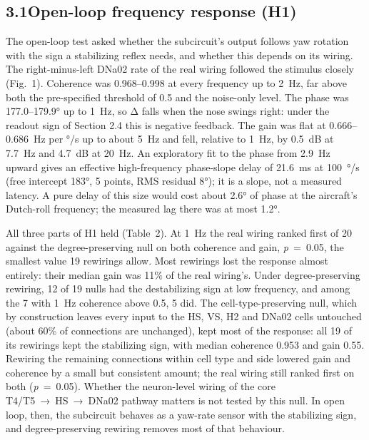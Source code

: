 \documentclass[11pt,letterpaper]{article}
\begin{document}
\subsection{\texorpdfstring{3.1\quad Open-loop frequency response
(H1)}{3.1Open-loop frequency response (H1)}}\label{open-loop-frequency-response-h1}

\noindent The open-loop test asked whether the subcircuit's output
follows yaw rotation with the sign a stabilizing reflex needs, and
whether this depends on its wiring. The right-minus-left DNa02 rate of
the real wiring followed the stimulus closely (Fig.~1). Coherence was
0.968--0.998 at every frequency up to 2~Hz, far above both the
pre-specified threshold of 0.5 and the noise-only level. The phase was
177.0--179.9° up to 1~Hz, so Δ falls when the nose swings right: under
the readout sign of Section 2.4 this is negative feedback. The gain was
flat at 0.666--0.686~Hz per °/s up to about 5~Hz and fell, relative to
1~Hz, by 0.5~dB at 7.7~Hz and 4.7~dB at 20~Hz. An exploratory fit to the
phase from 2.9~Hz upward gives an effective high-frequency phase-slope
delay of 21.6~ms at 100~°/s (free intercept 183°, 5 points, RMS residual
8°); it is a slope, not a measured latency. A pure delay of this size
would cost about 2.6° of phase at the aircraft's Dutch-roll frequency;
the measured lag there was at most 1.2°.

All three parts of H1 held (Table~2). At 1~Hz the real wiring ranked
first of 20 against the degree-preserving null on both coherence and
gain, \emph{p}~=~0.05, the smallest value 19 rewirings allow. Most
rewirings lost the response almost entirely: their median gain was 11\%
of the real wiring's. Under degree-preserving rewiring, 12 of 19 nulls
had the destabilizing sign at low frequency, and among the 7 with 1~Hz
coherence above 0.5, 5 did. The cell-type-preserving null, which by
construction leaves every input to the HS, VS, H2 and DNa02 cells
untouched (about 60\% of connections are unchanged), kept most of the
response: all 19 of its rewirings kept the stabilizing sign, with median
coherence 0.953 and gain 0.55. Rewiring the remaining connections within
cell type and side lowered gain and coherence by a small but consistent
amount; the real wiring still ranked first on both (\emph{p}~=~0.05).
Whether the neuron-level wiring of the core T4/T5~→~HS~→~DNa02 pathway
matters is not tested by this null. In open loop, then, the subcircuit
behaves as a yaw-rate sensor with the stabilizing sign, and
degree-preserving rewiring removes most of that behaviour.
\end{document}

